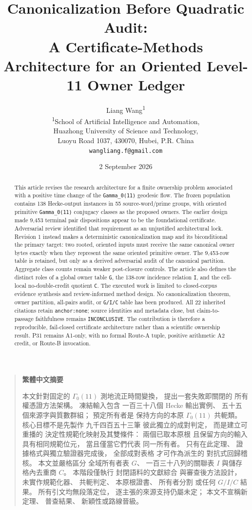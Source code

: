 \documentclass[11pt]{article}
\title{Canonicalization Before Quadratic Audit:\\
A Certificate-Methods Architecture for an Oriented Level-11 Owner Ledger}
\author{Liang Wang\textsuperscript{1}\\
\small \textsuperscript{1}School of Artificial Intelligence and Automation,\\
\small Huazhong University of Science and Technology,\\
\small Luoyu Road 1037, 430070, Hubei, P.R. China\\
\small \texttt{wangliang.f@gmail.com}}
\date{2 September 2026}
\newenvironment{zhabstract}
  {\begin{quotation}\cjkfont\small\raggedright\noindent\textbf{繁體中文摘要}\par\smallskip\mdseries}
  {\end{quotation}}
\begin{document}
\maketitle

\begin{abstract}

This article revises the research architecture for a finite ownership
problem associated with a positive time change of the
\texttt{Gamma\_0(11)} geodesic flow. The frozen population contains 138
Hecke-output instances in 55 source-word/prime groups, with oriented
primitive \texttt{Gamma\_0(11)} conjugacy classes as the proposed
owners. The earlier design made 9,453 terminal pair dispositions appear
to be the foundational certificate. Adversarial review identified that
requirement as an unjustified architectural lock. Revision 1 instead
makes a deterministic canonicalization map and its biconditional the
primary target: two rooted, oriented inputs must receive the same
canonical owner bytes exactly when they represent the same oriented
primitive owner. The 9,453-row table is retained, but only as a derived
adversarial audit of the canonical partition. Aggregate class counts
remain weaker post-closure controls. The article also defines the
distinct roles of a global owner table \texttt{G}, the 138-row incidence
relation \texttt{I}, and the cell-local no-double-credit quotient
\texttt{C}. The executed work is limited to closed-corpus evidence
synthesis and review-informed method design. No canonicalization
theorem, owner partition, all-pairs audit, or \texttt{G/I/C} table has
been produced. All 22 inherited citations retain \texttt{anchor:none};
source identities and metadata close, but claim-to-passage faithfulness
remains \texttt{INCONCLUSIVE}. The contribution is therefore a
reproducible, fail-closed certificate architecture rather than a
scientific ownership result. P31 remains A1-only, with no formal Route-A
tuple, positive arithmetic A2 credit, or Route-B invocation.
\end{abstract}

\begin{zhabstract}
本文針對固定的 $\Gamma_0(11)$ 測地流正時間變換， 提出一套失敗即關閉的 所有權憑證方法架構。 凍結輸入包含 一百三十八個 Hecke 輸出實例、 五十五個來源字與質數群組； 預定所有者是 保持方向的本原 $\Gamma_0(11)$ 共軛類。 核心目標不是先製作 九千四百五十三筆 彼此獨立的成對判定， 而是建立可重播的 決定性規範化映射及其雙條件： 兩個已取本原根 且保留方向的輸入 具有相同規範位元， 當且僅當它們代表 同一所有者。 只有在此定理、 證據格式與獨立驗證器完成後， 全部成對表格 才可作為派生的 對抗式回歸稽核。 本文並嚴格區分 全域所有者表 $G$、 一百三十八列的關聯表 $I$ 與儲存格內去重商 $C$。 本階段僅執行 封閉語料的文獻綜合 與審查後方法設計， 未實作規範化器、 共軛判定、 本原根證書、 所有者分割 或任何 $G/I/C$ 結果。 所有引文均無段落定位， 逐主張的來源支持仍屬未定； 本文不宣稱新定理、 普查結果、 新穎性或路線晉級。
\end{zhabstract}
\end{document}
